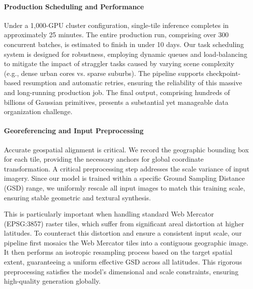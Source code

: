 \paragraph{Production Scheduling and Performance}
Under a 1,000-GPU cluster configuration, single-tile inference completes in approximately 25 minutes. The entire production run, comprising over 300 concurrent batches, is estimated to finish in under 10 days. Our task scheduling system is designed for robustness, employing dynamic queues and load-balancing to mitigate the impact of straggler tasks caused by varying scene complexity (e.g., dense urban cores vs. sparse suburbs). The pipeline supports checkpoint-based resumption and automatic retries, ensuring the reliability of this massive and long-running production job. The final output, comprising hundreds of billions of Gaussian primitives, presents a substantial yet manageable data organization challenge.

\paragraph{Georeferencing and Input Preprocessing}
Accurate geospatial alignment is critical. We record the geographic bounding box for each tile, providing the necessary anchors for global coordinate transformation. A critical preprocessing step addresses the scale variance of input imagery. Since our model is trained within a specific Ground Sampling Distance (GSD) range, we uniformly rescale all input images to match this training scale, ensuring stable geometric and textural synthesis.

This is particularly important when handling standard Web Mercator (EPSG:3857) raster tiles, which suffer from significant areal distortion at higher latitudes. To counteract this distortion and ensure a consistent input scale, our pipeline first mosaics the Web Mercator tiles into a contiguous geographic image. It then performs an isotropic resampling process based on the target spatial extent, guaranteeing a uniform effective GSD across all latitudes. This rigorous preprocessing satisfies the model's dimensional and scale constraints, ensuring high-quality generation globally.

